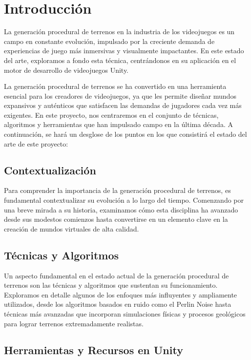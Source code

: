 \section{Introducción}

La generación procedural de terrenos en la industria de los videojuegos es un campo en constante evolución, impulsado por la creciente demanda de experiencias de juego más inmersivas y visualmente impactantes. En este estado del arte, exploramos a fondo esta técnica, centrándonos en su aplicación en el motor de desarrollo de videojuegos Unity.

La generación procedural de terrenos se ha convertido en una herramienta esencial para los creadores de videojuegos, ya que les permite diseñar mundos expansivos y auténticos que satisfacen las demandas de jugadores cada vez más exigentes. En este proyecto, nos centraremos en el conjunto de técnicas, algoritmos y herramientas que han impulsado campo en la última década. A continuación, se hará un desglose de los puntos en los que consistirá el estado del arte de este proyecto:

\subsection{Contextualización}

Para comprender la importancia de la generación procedural de terrenos, es fundamental contextualizar su evolución a lo largo del tiempo. Comenzando por una breve mirada a su historia, examinamos cómo esta disciplina ha avanzado desde sus modestos comienzos hasta convertirse en un elemento clave en la creación de mundos virtuales de alta calidad.

\subsection{Técnicas y Algoritmos}

Un aspecto fundamental en el estado actual de la generación procedural de terrenos son las técnicas y algoritmos que sustentan su funcionamiento. Exploramos en detalle algunos de los enfoques más influyentes y ampliamente utilizados, desde los algoritmos basados en ruido como el Perlin Noise hasta técnicas más avanzadas que incorporan simulaciones físicas y procesos geológicos para lograr terrenos extremadamente realistas.

\subsection{Herramientas y Recursos en Unity}

